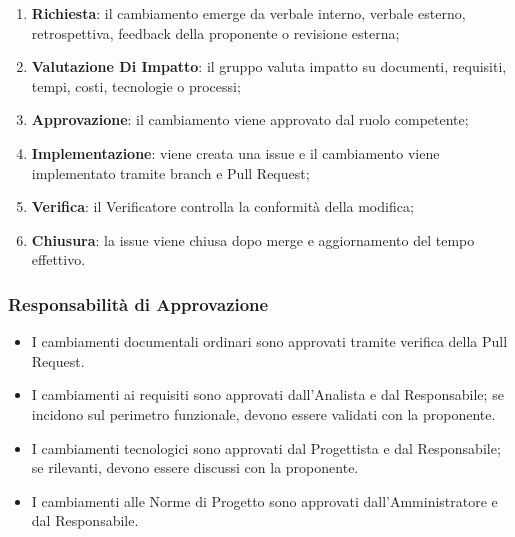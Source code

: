 \begin{enumerate}
    \item \textbf{Richiesta}: il cambiamento emerge da verbale interno, verbale esterno,
      retrospettiva, feedback della proponente o revisione esterna;

    \item \textbf{Valutazione Di Impatto}: il gruppo valuta impatto su documenti,
    requisiti, tempi, costi, tecnologie o processi;

    \item \textbf{Approvazione}: il cambiamento viene approvato dal ruolo competente;

    \item \textbf{Implementazione}: viene creata una issue e il cambiamento viene
    implementato tramite branch e Pull Request;

    \item \textbf{Verifica}: il Verificatore controlla la conformità della modifica;

    \item \textbf{Chiusura}: la issue viene chiusa dopo merge e aggiornamento del
    tempo effettivo.
\end{enumerate}


\subsubsection{Responsabilità di Approvazione}

\begin{itemize}
    \item I cambiamenti documentali ordinari sono approvati tramite verifica della
    Pull Request.

    \item I cambiamenti ai requisiti sono approvati dall'Analista e dal Responsabile;
    se incidono sul perimetro funzionale, devono essere validati con la proponente.

    \item I cambiamenti tecnologici sono approvati dal Progettista e dal Responsabile;
    se rilevanti, devono essere discussi con la proponente.

    \item I cambiamenti alle Norme di Progetto sono approvati dall'Amministratore e
    dal Responsabile.
\end{itemize}


